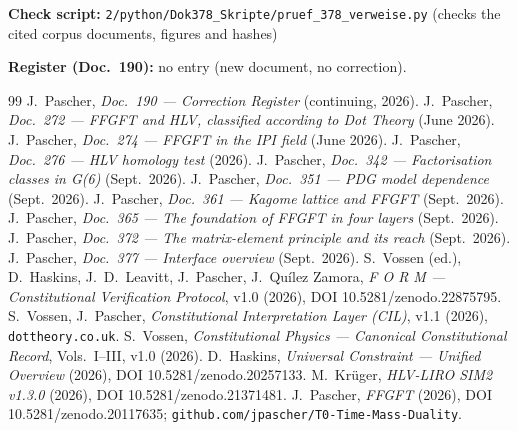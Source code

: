 \medskip
\noindent\textbf{Check script:} \texttt{2/python/Dok378\_Skripte/pruef\_378\_verweise.py}
(checks the cited corpus documents, figures and hashes)

\medskip
\noindent\textbf{Register (Doc.~190):} no entry (new document, no correction).

\begin{thebibliography}{99}
 J.~Pascher, \emph{Doc.~190 --- Correction Register} (continuing, 2026).
 J.~Pascher, \emph{Doc.~272 --- FFGFT and HLV, classified according to Dot Theory} (June 2026).
 J.~Pascher, \emph{Doc.~274 --- FFGFT in the IPI field} (June 2026).
 J.~Pascher, \emph{Doc.~276 --- HLV homology test} (2026).
 J.~Pascher, \emph{Doc.~342 --- Factorisation classes in G(6)} (Sept.~2026).
 J.~Pascher, \emph{Doc.~351 --- PDG model dependence} (Sept.~2026).
 J.~Pascher, \emph{Doc.~361 --- Kagome lattice and FFGFT} (Sept.~2026).
 J.~Pascher, \emph{Doc.~365 --- The foundation of FFGFT in four layers} (Sept.~2026).
 J.~Pascher, \emph{Doc.~372 --- The matrix-element principle and its reach} (Sept.~2026).
 J.~Pascher, \emph{Doc.~377 --- Interface overview} (Sept.~2026).
 S.~Vossen (ed.), D.~Haskins, J.~D.~Leavitt, J.~Pascher, J.~Quílez Zamora,
  \emph{F O R M --- Constitutional Verification Protocol}, v1.0 (2026),
  DOI 10.5281/zenodo.22875795.
 S.~Vossen, J.~Pascher, \emph{Constitutional Interpretation Layer (CIL)}, v1.1 (2026),
  \texttt{dottheory.co.uk}.
 S.~Vossen, \emph{Constitutional Physics --- Canonical Constitutional Record}, Vols.~I--III, v1.0 (2026).
 D.~Haskins, \emph{Universal Constraint --- Unified Overview} (2026), DOI 10.5281/zenodo.20257133.
 M.~Krüger, \emph{HLV-LIRO SIM2 v1.3.0} (2026), DOI 10.5281/zenodo.21371481.
 J.~Pascher, \emph{FFGFT} (2026), DOI 10.5281/zenodo.20117635;
  \texttt{github.com/jpascher/T0-Time-Mass-Duality}.
\end{thebibliography}
